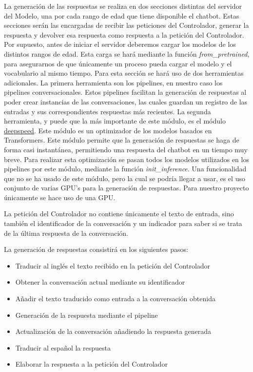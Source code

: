 La generación de las respuestas se realiza en dos secciones distintas del servidor del Modelo, una por cada rango de edad que tiene disponible el chatbot. Estas secciones serán las encargadas de recibir las peticiones del Controlador, generar la respuesta y devolver esa respuesta como respuesta a la petición del Controlador. Por supuesto, antes de iniciar el servidor deberemos cargar los modelos de los distintos rangos de edad. Esta carga se hará mediante la función \textit{from\_pretrained}, para asegurarnos de que únicamente un proceso pueda cargar el modelo y el vocabulario al mismo tiempo. Para esta sección se hará uso de dos herramientas adicionales. La primera herramienta son los pipelines, en nuestro caso los pipelines conversacionales. Estos pipelines facilitan la generación de respuestas al poder crear instancias de las conversaciones, las cuales guardan un registro de las entradas y sus correspondientes respuestas más recientes. La segunda herramienta, y puede que la más importante de este módulo, es el módulo \href{https://deepspeed.readthedocs.io/en/latest/}{deepspeed}. Este módulo es un optimizador de los modelos basados en Transformers. Este módulo permite que la generación de respuestas se haga de forma casi instantánea, permitiendo una respuesta del chatbot en un tiempo muy breve. Para realizar esta optimización se pasan todos los modelos utilizados en los pipelines por este módulo, mediante la función \textit{init\_inference}. Una funcionalidad que no se ha usado de este módulo, pero la cual se podría llegar a usar, es el uso conjunto de varias GPU's para la generación de respuestas. Para nuestro proyecto únicamente se hace uso de una GPU.

La petición del Controlador no contiene únicamente el texto de entrada, sino también el identificador de la conversación y un indicador para saber si se trata de la última respuesta de la conversación.

La generación de respuestas consistirá en los siguientes pasos:

\begin{itemize}
\item Traducir al inglés el texto recibido en la petición del Controlador
\item Obtener la conversación actual mediante su identificador
\item Añadir el texto traducido como entrada a la conversación obtenida
\item Generación de la respuesta mediante el pipeline
\item Actualización de la conversación añadiendo la respuesta generada
\item Traducir al español la respuesta
\item Elaborar la respuesta a la petición del Controlador
\end{itemize}

